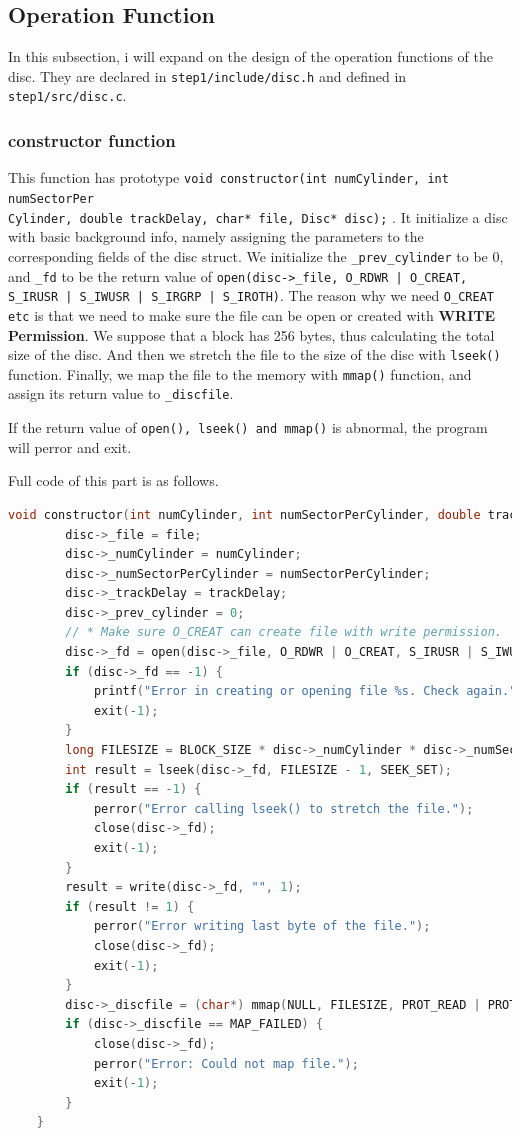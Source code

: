 \subsection{Operation Function}
In this subsection, i will expand on the design of the operation functions of the disc. They are declared in 
\texttt{step1/include/disc.h} and defined in \texttt{step1/src/disc.c}.

\subsubsection{constructor function}
This function has prototype \texttt{void constructor(int numCylinder, int numSectorPer\\Cylinder, double trackDelay, char* file, Disc* disc);}
. It initialize a disc with basic background info, namely assigning the parameters to the corresponding fields of the disc struct.
We initialize the \texttt{_prev_cylinder} to be 0, and \texttt{_fd} to be the return value of 
\texttt{open(disc->_file, O_RDWR | O_CREAT, S_IRUSR | S_IWUSR | S_IRGRP | S_IROTH)}. The reason why we need \texttt{O\_CREAT etc} 
is that we need to make sure the file can be open or created with \textbf{WRITE Permission}.
We suppose that a block has 256 bytes, thus calculating the total size of the disc.
And then we stretch the file to the size of the disc with \texttt{lseek()} function.
Finally, we map the file to the memory with \texttt{mmap()} function, and assign its return value to \texttt{_discfile}.

If the return value of \texttt{open(), lseek() and mmap()} is abnormal, the program will perror and exit.

Full code of this part is as follows.

\begin{lstlisting}[language=C]
    void constructor(int numCylinder, int numSectorPerCylinder, double trackDelay, char* file, Disc* disc) {
        disc->_file = file;
        disc->_numCylinder = numCylinder;
        disc->_numSectorPerCylinder = numSectorPerCylinder;
        disc->_trackDelay = trackDelay;
        disc->_prev_cylinder = 0;
        // * Make sure O_CREAT can create file with write permission.
        disc->_fd = open(disc->_file, O_RDWR | O_CREAT, S_IRUSR | S_IWUSR | S_IRGRP | S_IROTH);
        if (disc->_fd == -1) {
            printf("Error in creating or opening file %s. Check again.", disc->_file);
            exit(-1);
        }
        long FILESIZE = BLOCK_SIZE * disc->_numCylinder * disc->_numSectorPerCylinder;
        int result = lseek(disc->_fd, FILESIZE - 1, SEEK_SET);
        if (result == -1) {
            perror("Error calling lseek() to stretch the file.");
            close(disc->_fd);
            exit(-1);
        }
        result = write(disc->_fd, "", 1);
        if (result != 1) {
            perror("Error writing last byte of the file.");
            close(disc->_fd);
            exit(-1);
        }
        disc->_discfile = (char*) mmap(NULL, FILESIZE, PROT_READ | PROT_WRITE, MAP_SHARED, disc->_fd, 0);
        if (disc->_discfile == MAP_FAILED) {
            close(disc->_fd);
            perror("Error: Could not map file.");
            exit(-1);
        }
    }
\end{lstlisting}

